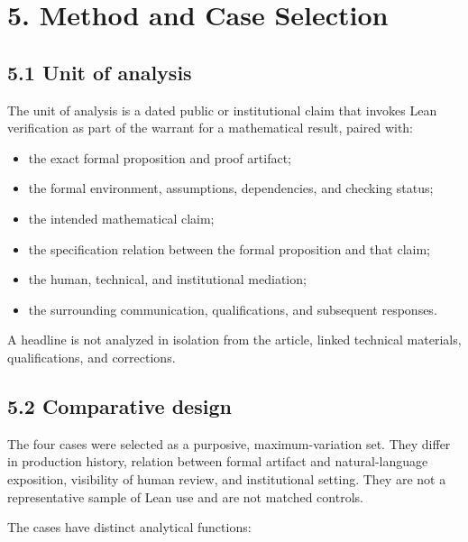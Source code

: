 \documentclass[sn-apa]{sn-jnl}
\begin{document}
\section{5. Method and Case Selection}

\subsection{5.1 Unit of analysis}

The unit of analysis is a dated public or institutional claim that invokes Lean verification as part of the warrant for a mathematical result, paired with:

\begin{itemize}

\item the exact formal proposition and proof artifact;

\item the formal environment, assumptions, dependencies, and checking status;

\item the intended mathematical claim;

\item the specification relation between the formal proposition and that claim;

\item the human, technical, and institutional mediation;

\item the surrounding communication, qualifications, and subsequent responses.

\end{itemize}

A headline is not analyzed in isolation from the article, linked technical materials, qualifications, and corrections.

\subsection{5.2 Comparative design}

The four cases were selected as a purposive, maximum-variation set. They differ in production history, relation between formal artifact and natural-language exposition, visibility of human review, and institutional setting. They are not a representative sample of Lean use and are not matched controls.

The cases have distinct analytical functions:
\end{document}

